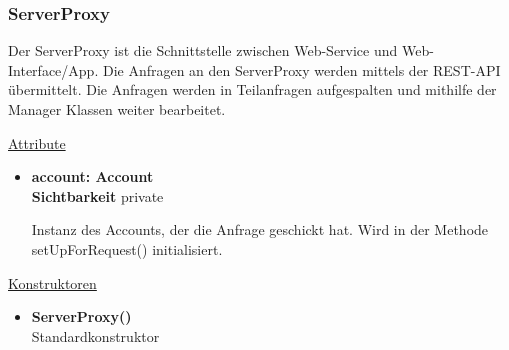 \subsubsection{ServerProxy} \label{service:klasse:ServerProxy}
Der ServerProxy ist die Schnittstelle zwischen Web-Service und Web-Interface/App. Die Anfragen an den ServerProxy werden mittels der REST-API übermittelt. Die Anfragen werden in Teilanfragen aufgespalten und mithilfe der Manager Klassen weiter bearbeitet. \newline

\underline{Attribute}
\begin{itemize}
\itemsep0pt
\item \textbf{account: Account} \hfill\\ 
\textbf{Sichtbarkeit} private

Instanz des Accounts, der die Anfrage geschickt hat. Wird in der Methode setUpForRequest() initialisiert.
\end{itemize}

\underline{Konstruktoren}
\begin{itemize}
\itemsep0pt
\item \textbf{ServerProxy()} \hfill\\
Standardkonstruktor
\end{itemize}


